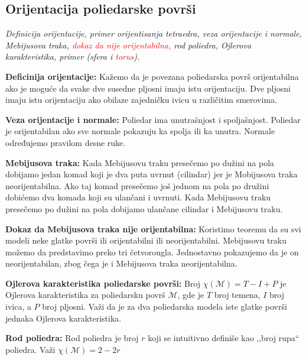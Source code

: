 \documentclass[12pt]{article}
\newcommand{\ocena}[1]{\textcolor{red}{#1}}
\begin{document}
\subsection{Orijentacija poliedarske površi}
\textit{Definicija orijentacije, primer orijentisanja tetraedra, veza
    orijentacije i normale, Mebijusova traka, \ocena{dokaz da nije orijentabilna,} rod
    poliedra, Ojlerova karakteristika, primer (sfera i \ocena{torus}).}
\par
\vspace*{1cm}

\textbf{Deficinija orijentacije:} Kažemo da je povezana poliedarska površ
orijentabilna ako je moguće da svake dve susedne pljosni imaju istu
orijentaciju. Dve pljosni imaju istu orijentaciju ako obilaze zajedničku ivicu
u različitim smerovima.
\par

\textbf{Veza orijentacije i normale:} Poliedar ima unutrašnjost i spoljašnjost.
Poliedar je orijentabilan ako sve normale pokazuju ka spolja ili ka unutra.
Normale određujemo pravilom desne ruke.
\par

\textbf{Mebijusova traka:} Kada Mebijusovu traku presečemo po dužini na pola
dobijamo jedan komad koji je dva puta uvrnut (cilindar) jer je Mobijusova traka
neorijentabilna. Ako taj komad presečemo još jednom na pola po družini dobićemo
dva komada koji su ulančani i uvrnuti. Kada Mebijusovu traku presečemo po
dužini na pola dobijamo ulančane cilindar i Mebijusovu traku.
\par

\textbf{Dokaz da Mebijusova traka nije orijentabilna:} Koristimo teoremu da su
svi modeli neke glatke površi ili orijentabilni ili neorijentabilni. Mebijusovu
traku možemo da predstavimo preko tri četvorougla. Jednostavno pokazujemo da je
on neorijentabilan, zbog čega je i Mebijusova traka neorijentabilna.
\par

\textbf{Ojlerova karakteristika poliedarske površi:} Broj
$\chi(\mathcal{M})=T-I+P$ je Ojlerova karakteristika za poliedarsku površ
$\mathcal{M}$, gde je $T$ broj temena, $I$ broj ivica, a $P$ broj pljosni. Važi
da je za dva poliedarska modela iste glatke površi jednaka Ojlerova
karakteristika.
\par

\textbf{Rod poliedra:} Rod poliedra je broj $r$ koji se intuitivno definiše kao
,,broj rupa`` poliedra. Važi $\chi(\mathcal{M})=2-2r$
\par
\end{document}
